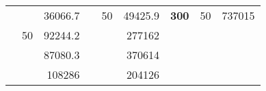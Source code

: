 \begin{table}[H]
\begin{tabular}{|ccrccrccc}
\rowcolor[HTML]{DDFDFF} 
\multicolumn{1}{|c|}{\cellcolor[HTML]{FFFFC7}}                                & \multicolumn{1}{c|}{\cellcolor[HTML]{DDFDFF}}                      & \multicolumn{1}{r|}{\cellcolor[HTML]{DAE8FC}36066.7}   & \multicolumn{1}{c|}{\cellcolor[HTML]{FFFFC7}}                                & \multicolumn{1}{c|}{\multirow{-10}{*}{\cellcolor[HTML]{DDFDFF}50}}  & \multicolumn{1}{r|}{\cellcolor[HTML]{DDFDFF}49425.9}   & \multicolumn{1}{c|}{\multirow{-19}{*}{\cellcolor[HTML]{FFFFC7}\textbf{300}}} & \multicolumn{1}{c|}{\multirow{-10}{*}{\cellcolor[HTML]{DDFDFF}50}} & \multicolumn{1}{r|}{\cellcolor[HTML]{DDFDFF}737015}    \\ \cline{3-3} \cline{5-9} 
\multicolumn{1}{|c|}{\cellcolor[HTML]{FFFFC7}}                                & \multicolumn{1}{c|}{\multirow{-10}{*}{\cellcolor[HTML]{DDFDFF}50}} & \multicolumn{1}{r|}{\cellcolor[HTML]{DDFDFF}92244.2}   & \multicolumn{1}{c|}{\cellcolor[HTML]{FFFFC7}}                                & \multicolumn{1}{c|}{\cellcolor[HTML]{DAE8FC}}                       & \multicolumn{1}{r|}{\cellcolor[HTML]{DAE8FC}277162}    &                                                                              &                                                                    &                                                        \\ \cline{2-3} \cline{6-6}
\multicolumn{1}{|c|}{\cellcolor[HTML]{FFFFC7}}                                & \multicolumn{1}{c|}{\cellcolor[HTML]{DAE8FC}}                      & \multicolumn{1}{r|}{\cellcolor[HTML]{DAE8FC}87080.3}   & \multicolumn{1}{c|}{\cellcolor[HTML]{FFFFC7}}                                & \multicolumn{1}{c|}{\cellcolor[HTML]{DAE8FC}}                       & \multicolumn{1}{r|}{\cellcolor[HTML]{DDFDFF}370614}    &                                                                              &                                                                    &                                                        \\ \cline{3-3} \cline{6-6}
\multicolumn{1}{|c|}{\cellcolor[HTML]{FFFFC7}}                                & \multicolumn{1}{c|}{\cellcolor[HTML]{DAE8FC}}                      & \multicolumn{1}{r|}{\cellcolor[HTML]{DDFDFF}108286}    & \multicolumn{1}{c|}{\cellcolor[HTML]{FFFFC7}}                                & \multicolumn{1}{c|}{\cellcolor[HTML]{DAE8FC}}                       & \multicolumn{1}{r|}{\cellcolor[HTML]{DAE8FC}204126}    &                                                                              &                                                                    &                                                        \\ \cline{3-3} \cline{6-6}

\end{tabular}
\end{table}
